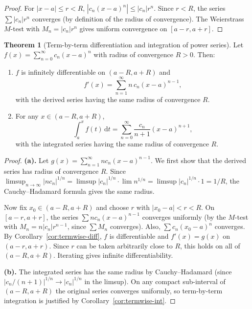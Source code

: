 \documentclass[12pt,a4paper]{book}
\theoremstyle{definition}
\newtheorem{theorem}{Theorem}[chapter]
\newcommand{\abs}[1]{\left\lvert #1 \right\rvert}
\newcommand{\dd}{\,\mathrm{d}}
\begin{document}
\begin{proof}
  For $\abs{x-a}\le r<R$, $\abs{c_n(x-a)^n}\le\abs{c_n}r^n$.  Since
  $r<R$, the series $\sum\abs{c_n}r^n$ converges (by definition of the
  radius of convergence).  The Weierstrass $M$-test with
  $M_n=\abs{c_n}r^n$ gives uniform convergence on $[a-r,a+r]$.
\end{proof}

\begin{theorem}[Term-by-term differentiation and integration of power series]\label{thm:power-diff-int}
  Let $f(x)=\sum_{n=0}^{\infty}c_n(x-a)^n$ with radius of convergence
  $R>0$.  Then:
  \begin{enumerate}[label=(\alph*)]
    \item $f$ is infinitely differentiable on $(a-R,a+R)$ and
      \[
        f'(x) = \sum_{n=1}^{\infty}n\,c_n(x-a)^{n-1},
      \]
      with the derived series having the same radius of convergence $R$.
    \item For any $x\in(a-R,a+R)$,
      \[
        \int_a^x f(t)\dd t
        = \sum_{n=0}^{\infty}\frac{c_n}{n+1}(x-a)^{n+1},
      \]
      with the integrated series having the same radius of convergence $R$.
  \end{enumerate}
\end{theorem}

\begin{proof}
  \textbf{(a).}\;
  Let $g(x)=\sum_{n=1}^{\infty}nc_n(x-a)^{n-1}$.  We first show that
  the derived series has radius of convergence $R$.  Since
  $\limsup_{n\to\infty}\abs{nc_n}^{1/n}
  =\limsup\abs{c_n}^{1/n}\cdot\lim n^{1/n}
  =\limsup\abs{c_n}^{1/n}\cdot1=1/R$, the Cauchy--Hadamard formula
  gives the same radius.

  Now fix $x_0\in(a-R,a+R)$ and choose $r$ with $\abs{x_0-a}<r<R$.
  On $[a-r,a+r]$, the series $\sum nc_n(x-a)^{n-1}$ converges uniformly
  (by the $M$-test with $M_n=n\abs{c_n}r^{n-1}$, since $\sum M_n$
  converges).  Also, $\sum c_n(x_0-a)^n$ converges.  By
  Corollary~\ref{cor:termwise-diff}, $f$ is differentiable and
  $f'(x)=g(x)$ on $(a-r,a+r)$.  Since $r$ can be taken arbitrarily
  close to $R$, this holds on all of $(a-R,a+R)$.  Iterating gives
  infinite differentiability.

  \textbf{(b).}\;
  The integrated series has the same radius by Cauchy--Hadamard (since
  $\abs{c_n/(n+1)}^{1/n}\to\abs{c_n}^{1/n}$ in the limsup).  On any
  compact sub-interval of $(a-R,a+R)$ the original series converges
  uniformly, so term-by-term integration is justified by
  Corollary~\ref{cor:termwise-int}.
\end{proof}
\end{document}
